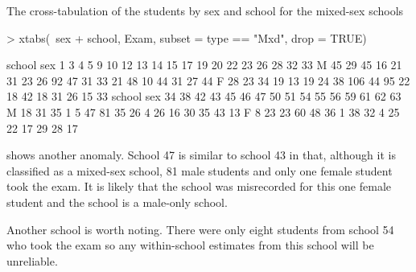 \documentclass[12pt]{article}
\begin{document}
The cross-tabulation of the students by sex and school for the
mixed-sex schools
\begin{Schunk}
\begin{Sinput}
> xtabs(~sex + school, Exam, subset = type == "Mxd", drop = TRUE)
\end{Sinput}
\begin{Soutput}
   school
sex   1   3   4   5   9  10  12  13  14  15  17  19  20  22  23  26  28  32  33
  M  45  29  45  16  21  31  23  26  92  47  31  33  21  48  10  44  31  27  44
  F  28  23  34  19  13  19  24  38 106  44  95  22  18  42  18  31  26  15  33
   school
sex  34  38  42  43  45  46  47  50  51  54  55  56  59  61  62  63
  M  18  31  35   1   5  47  81  35  26   4  26  16  30  35  43  13
  F   8  23  23  60  48  36   1  38  32   4  25  22  17  29  28  17
\end{Soutput}
\end{Schunk}
shows another anomaly.  School 47 is similar to school 43 in that,
although it is classified as a mixed-sex school, 81 male students
and only one female student took the exam.  It is likely that the
school was misrecorded for this one female student and the school is a
male-only school.  

Another school is worth noting. There were only eight students from
school 54 who took the exam so any within-school estimates from this
school will be unreliable.
\end{document}
